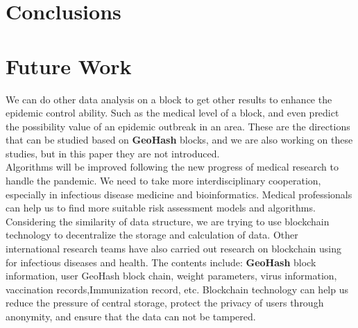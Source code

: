 \documentclass[sigplan,screen]{acmart}
\begin{document}
\section{Conclusions}
\section{Future Work}
We can do other data analysis on a block to get other results to enhance the epidemic control ability.
Such as the medical level of a block, and even predict the possibility value of an epidemic outbreak in an area.
These are the directions that can be studied based on \textbf{GeoHash} blocks, and we are also working on these studies, but in this paper they are not introduced.
\\
Algorithms will be improved following the new progress of medical research to handle the pandemic.
We need to take more interdisciplinary cooperation, especially in infectious disease medicine and bioinformatics.
Medical professionals can help us to find more suitable risk assessment models and algorithms.
\\
Considering the similarity of data structure, we are trying to use blockchain technology to decentralize the storage and calculation of data.
Other international research teams have also carried out research on blockchain using for infectious diseases and health.\cite{nguyen2020blockchain}\cite{CryptocurrencyNewUse2020Coronavirus}
The contents include: \textbf{GeoHash} block information, user GeoHash block chain, weight parameters, virus information, vaccination records,Immunization record, etc.
Blockchain technology can help us reduce the pressure of central storage, protect the privacy of users through anonymity\cite{nakamoto2019bitcoin}, and ensure that the data can not be tampered.\cite{armstrong2016move}


\end{document}
